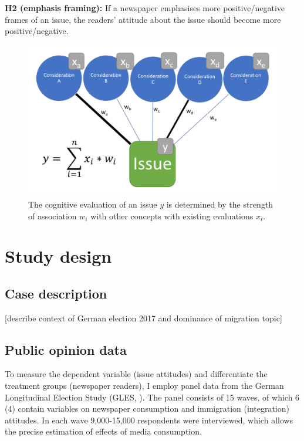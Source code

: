 \documentclass{article}
\begin{document}
\textbf{H2 (emphasis framing):} If a newspaper emphasises more positive/negative frames of an issue, the readers' attitude about the issue should become more positive/negative.

\begin{center}
\begin{figure}
    \centering
    \includegraphics[width=\textwidth]{paper/vis/CognitiveStorage.png}
    \caption{The cognitive evaluation of an issue $y$ is determined by the strength of association $w_i$ with other concepts with existing evaluations $x_i$.}
    \label{fig:cogStor}
\end{figure}
\end{center}



\section{Study design}

\subsection{Case description}


[describe context of German election 2017 and dominance of migration topic]

\subsection{Public opinion data}

To measure the dependent variable (issue attitudes) and differentiate the treatment groups (newspaper readers), I employ panel data from the German Longitudinal Election Study (GLES, \cite{GLES2019LongTermTracking}). The panel consists of 15 waves, of which 6 (4) contain variables on newspaper consumption and immigration (integration) attitudes. In each wave 9,000-15,000 respondents were interviewed, which allows the precise estimation of effects of media consumption.
\end{document}
